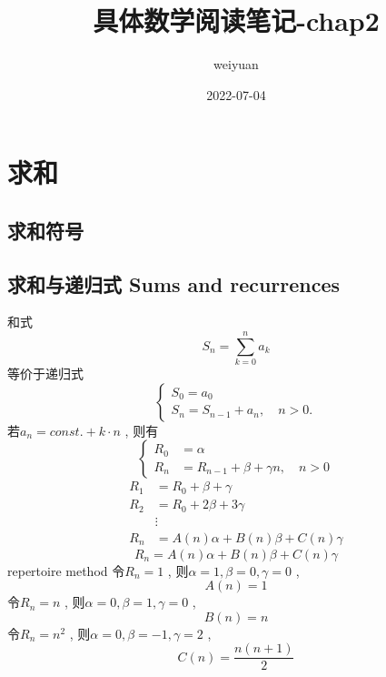 \documentclass[mode=geye]{elegantnote}
\title{具体数学阅读笔记-chap2}
\author{weiyuan}
\date{2022-07-04}
\begin{document}
\maketitle
\section{求和}
\subsection{求和符号}
\subsection{求和与递归式 Sums and recurrences}
和式
\begin{equation}
    S_n = \sum_{k=0}^{n}a_k
\end{equation}
等价于递归式
\begin{equation}
    \left\{
        \begin{array}{l}
            S_0 = a_0 \\
            S_n = S_{n-1}+a_n,\quad n>0.
        \end{array}
    \right.
\end{equation}
若$ a_n = const.+ k\cdot n $ , 则有
\begin{equation}\label{ReceEasy}
    \left\{
    \begin{aligned}
        R_0 &= \alpha \\
        R_n &= R_{n-1} + \beta + \gamma n, \quad n>0
    \end{aligned}
    \right.
\end{equation}
\begin{align*}
    R_1 &= R_0 + \beta + \gamma \\
    R_2 &= R_0 + 2\beta + 3\gamma \\
        &\vdots \\
    R_n &= A(n)\alpha + B(n)\beta + C(n)\gamma
\end{align*}
\begin{equation}\label{RecuEasyABC}
    R_n = A(n)\alpha + B(n)\beta + C(n)\gamma
\end{equation}
repertoire method
令$ R_n=1 $ , 则$ \alpha=1, \beta=0, \gamma=0 $ , 
\begin{equation*}
    A(n)=1
\end{equation*}
令$ R_n=n $ , 则$ \alpha=0, \beta=1, \gamma=0 $ , 
\begin{equation*}
    B(n)=n
\end{equation*}
令$ R_n=n^2 $ , 则$ \alpha=0, \beta=-1, \gamma=2 $ , 
\begin{equation*}
    C(n)= \frac{n(n+1)}{2}
\end{equation*}
\end{document}
